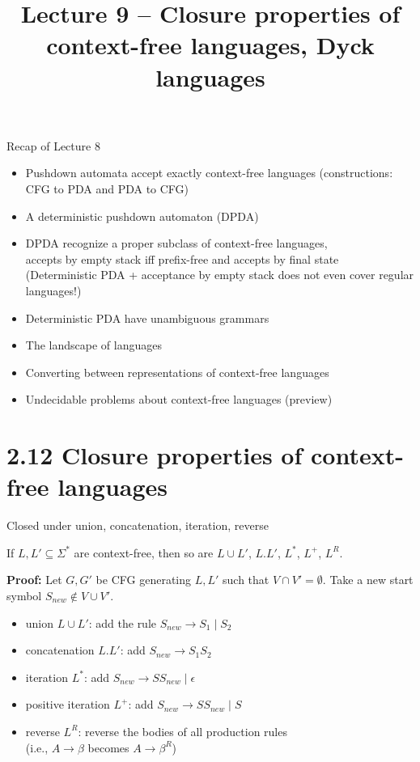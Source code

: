 \documentclass[handout]{beamer}
\title{Lecture 9 -- Closure properties of context-free languages, Dyck languages}
\begin{document}
\frame{\titlepage}


\begin{frame}{Recap of Lecture 8}
	
    \begin{itemize}
        \item Pushdown automata accept exactly context-free languages (constructions: CFG to PDA and PDA to CFG)
        \item A deterministic pushdown automaton (DPDA)
        \item DPDA recognize a proper subclass of context-free languages,\\ accepts by empty stack iff prefix-free and accepts by final state\\
        (Deterministic PDA + acceptance by empty stack does not even cover regular languages!)
        \item Deterministic PDA have unambiguous grammars
        \item The landscape of languages
        \item Converting between representations of context-free languages
        \item Undecidable problems about context-free languages (preview)
	\end{itemize}

\end{frame}


\section*{2.12 Closure properties of context-free languages}


\begin{frame}{Closed under union, concatenation, iteration, reverse}

    \begin{theorem}
        If $L,L'\subseteq\Sigma^*$ are context-free, then so are $L\cup L'$, $L.L'$, $L^*$, $L^+$, $L^R$.
    \end{theorem}
    \textbf{Proof:} Let $G,G'$ be CFG generating $L,L'$ such that $V\cap V'=\emptyset$. Take a new start symbol $S_{new}\notin V\cup V'$.
        
    \begin{itemize}
        \item \alert{union} $L\cup L'$: add the rule $S_{new}\rightarrow S_1\mid S_2$
        \item \alert{concatenation} $L.L'$: add $S_{new}\rightarrow S_1S_2$
        \item \alert{iteration} $L^*$: add $S_{new}\rightarrow SS_{new}\mid\epsilon$
        \item \alert{positive iteration} $L^+$: add $S_{new}\rightarrow SS_{new}\mid S$           
        \item \alert{reverse} $L^R$: reverse the bodies of all production rules \\(i.e., $A\to\beta$ becomes $A\to\beta^R$)\hfill\qedsymbol
    \end{itemize}

\end{frame}
\end{document}
